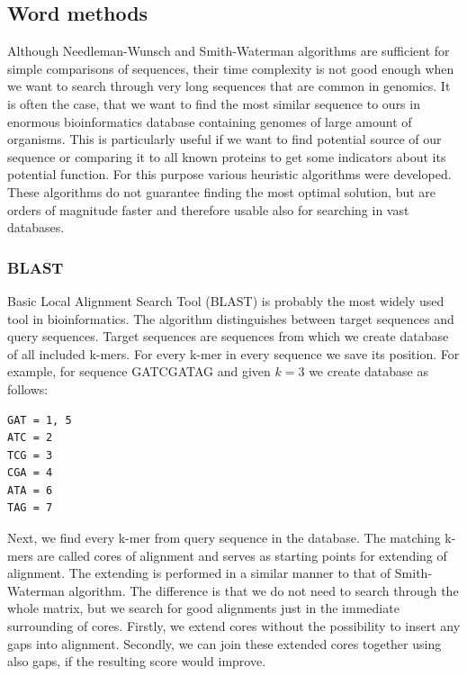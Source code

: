 \subsection{Word methods}
Although Needleman-Wunsch and Smith-Waterman algorithms are sufficient for simple comparisons of sequences, their time complexity is not good enough when we want to search through very long sequences that are common in genomics.
It is often the case, that we want to find the most similar sequence to ours in enormous bioinformatics database containing genomes of large amount of organisms.
This is particularly useful if we want to find potential source of our sequence or comparing it to all known proteins to get some indicators about its potential function.
For this purpose various heuristic algorithms were developed.
These algorithms do not guarantee finding the most optimal solution, but are orders of magnitude faster and therefore usable also for searching in vast databases.
 
\subsubsection{BLAST}
Basic Local Alignment Search Tool (BLAST) \cite{blast} is probably the most widely used tool in bioinformatics.
The algorithm distinguishes between target sequences and query sequences.
Target sequences are sequences from which we create database of all included k-mers.
For every k-mer in every sequence we save its position.
For example, for sequence GATCGATAG and given $k=3$ we create database as follows:
\begin{verbatim}
GAT = 1, 5
ATC = 2
TCG = 3
CGA = 4
ATA = 6
TAG = 7
\end{verbatim}
Next, we find every k-mer from query sequence in the database.
The matching k-mers are called cores of alignment and serves as starting points for extending of alignment.
The extending is performed in a similar manner to that of Smith-Waterman algorithm.
The difference is that we do not need to search through the whole matrix, but we search for good alignments just in the immediate surrounding of cores.
Firstly, we extend cores without the possibility to insert any gaps into alignment.
Secondly, we can join these extended cores together using also gaps, if the resulting score would improve. 

